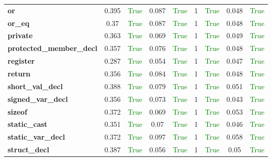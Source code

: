 \documentclass{article}
\begin{document}
\begin{xltabular}{\textwidth}{lcccccccc}
\textbf{{\fontsize{10}{12}\selectfont or}}& 0.395&\textcolor{green}{True}& 0.087&\textcolor{green}{True}& 1&\textcolor{green}{True}& 0.048&\textcolor{green}{True} \\[0.5ex]
\textbf{{\fontsize{10}{12}\selectfont or\_eq}}& 0.37&\textcolor{green}{True}& 0.087&\textcolor{green}{True}& 1&\textcolor{green}{True}& 0.048&\textcolor{green}{True} \\[0.5ex]
\textbf{{\fontsize{10}{12}\selectfont private}}& 0.363&\textcolor{green}{True}& 0.069&\textcolor{green}{True}& 1&\textcolor{green}{True}& 0.049&\textcolor{green}{True} \\[0.5ex]
\textbf{{\fontsize{10}{12}\selectfont protected\_member\_decl}}& 0.357&\textcolor{green}{True}& 0.076&\textcolor{green}{True}& 1&\textcolor{green}{True}& 0.048&\textcolor{green}{True} \\[0.5ex]
\textbf{{\fontsize{10}{12}\selectfont register}}& 0.287&\textcolor{green}{True}& 0.054&\textcolor{green}{True}& 1&\textcolor{green}{True}& 0.047&\textcolor{green}{True} \\[0.5ex]
\textbf{{\fontsize{10}{12}\selectfont return}}& 0.356&\textcolor{green}{True}& 0.084&\textcolor{green}{True}& 1&\textcolor{green}{True}& 0.048&\textcolor{green}{True} \\[0.5ex]
\textbf{{\fontsize{10}{12}\selectfont short\_val\_decl}}& 0.388&\textcolor{green}{True}& 0.079&\textcolor{green}{True}& 1&\textcolor{green}{True}& 0.051&\textcolor{green}{True} \\[0.5ex]
\textbf{{\fontsize{10}{12}\selectfont signed\_var\_decl}}& 0.356&\textcolor{green}{True}& 0.073&\textcolor{green}{True}& 1&\textcolor{green}{True}& 0.043&\textcolor{green}{True} \\[0.5ex]
\textbf{{\fontsize{10}{12}\selectfont sizeof}}& 0.372&\textcolor{green}{True}& 0.069&\textcolor{green}{True}& 1&\textcolor{green}{True}& 0.053&\textcolor{green}{True} \\[0.5ex]
\textbf{{\fontsize{10}{12}\selectfont static\_cast}}& 0.351&\textcolor{green}{True}& 0.07&\textcolor{green}{True}& 1&\textcolor{green}{True}& 0.046&\textcolor{green}{True} \\[0.5ex]
\textbf{{\fontsize{10}{12}\selectfont static\_var\_decl}}& 0.372&\textcolor{green}{True}& 0.097&\textcolor{green}{True}& 1&\textcolor{green}{True}& 0.058&\textcolor{green}{True} \\[0.5ex]
\textbf{{\fontsize{10}{12}\selectfont struct\_decl}}& 0.387&\textcolor{green}{True}& 0.056&\textcolor{green}{True}& 1&\textcolor{green}{True}& 0.05&\textcolor{green}{True} \\[0.5ex]

\end{xltabular}
\end{document}
